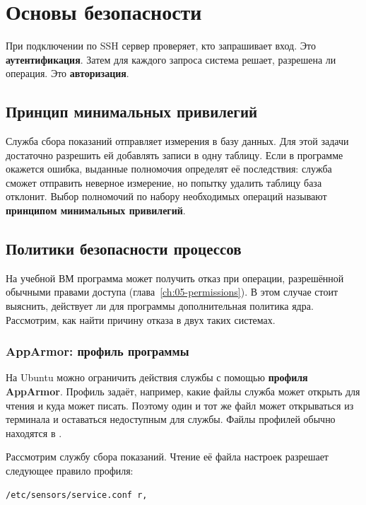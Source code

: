 \chapter{Основы безопасности}
\label{ch:24-security}

При подключении по SSH сервер проверяет, кто запрашивает вход.
Это \textbf{аутентификация}. Затем для каждого запроса система
решает, разрешена ли операция. Это \textbf{авторизация}.

\section{Принцип минимальных привилегий}

Служба сбора показаний отправляет измерения в базу данных. Для этой
задачи достаточно разрешить ей добавлять записи в одну таблицу.
Если в программе окажется ошибка, выданные полномочия определят её
последствия: служба сможет отправить неверное измерение, но попытку
удалить таблицу база отклонит. Выбор полномочий по набору необходимых
операций называют \textbf{принципом минимальных привилегий}.

\section{Политики безопасности процессов}

На учебной ВМ программа может получить отказ при операции, разрешённой
обычными правами доступа (глава~\ref{ch:05-permissions}).
В этом случае стоит выяснить, действует ли для программы дополнительная
политика ядра. Рассмотрим, как найти причину отказа в двух таких системах.

\subsection{AppArmor: профиль программы}

На Ubuntu можно ограничить действия службы с помощью \textbf{профиля
AppArmor}. Профиль задаёт, например, какие файлы служба может открыть
для чтения и куда может писать. Поэтому один и тот же файл может
открываться из терминала и оставаться недоступным для службы.
Файлы профилей обычно находятся в .

Рассмотрим службу сбора показаний. Чтение её файла настроек
разрешает следующее правило профиля:

\begin{verbatim}
/etc/sensors/service.conf r,
\end{verbatim}

